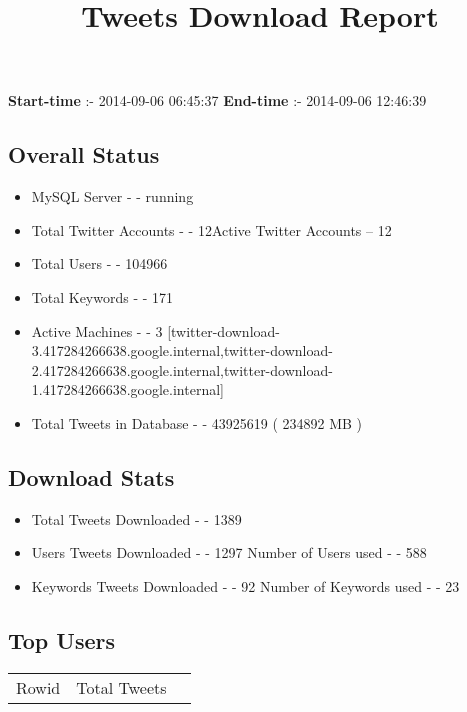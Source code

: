 \documentclass{article}\usepackage[T1]{fontenc}
\begin{document}
\title{\textbf{Tweets Download Report}}
               \date{}
                \maketitle
               \centerline{\textbf{Start-time} :- 2014-09-06 06:45:37 \hspace{40pt} \textbf{End-time} :- 2014-09-06 12:46:39}               \subsection*{Overall Status}                \begin{itemize}                \item MySQL Server - - running               \item Total Twitter Accounts - - 12\newline Active Twitter Accounts -- 12               \item Total Users - - 104966               \item Total Keywords - - 171               \item Active Machines - - 3 [twitter-download-3.417284266638.google.internal,twitter-download-2.417284266638.google.internal,twitter-download-1.417284266638.google.internal]               \item Total Tweets in Database - - 43925619 ( 234892 MB )               \end{itemize}               \subsection*{Download Stats}                \begin{itemize}                \item Total Tweets Downloaded - - 1389               \item Users Tweets Downloaded - - 1297 \newline Number of Users used - - 588               \item Keywords Tweets Downloaded - - 92 \newline Number of Keywords used - - 23              \end{itemize}              \subsection*{Top Users}\begin{tabular}{|c|c|c|}         \hline         Rowid & Total Tweets \\ 

\end{tabular}
\end{document}

